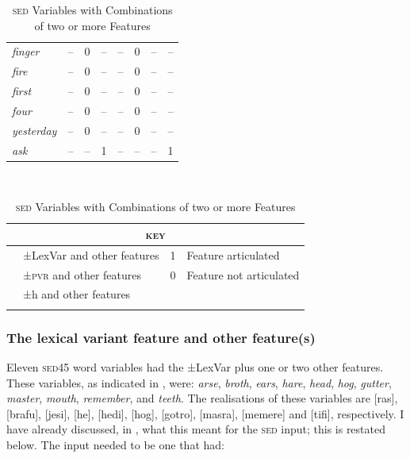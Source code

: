 {{{\begin{table}
\begin{tabularx}{.9\textwidth}{Xccccccc}
\emph{finger}\cellcolor{blue!35}  &\cellcolor{blue!35}  -- & \cellcolor{blue!35} 0 & \cellcolor{blue!35} -- &\cellcolor{blue!35}  -- & \cellcolor{blue!35} 0  & -- & --  \\   
\emph{fire} \cellcolor{blue!35}  &\cellcolor{blue!35}  -- & \cellcolor{blue!35} 0 & \cellcolor{blue!35} -- &\cellcolor{blue!35}  -- & \cellcolor{blue!35} 0  & -- & --  \\  
\emph{first} \cellcolor{blue!35}  &\cellcolor{blue!35}  -- & \cellcolor{blue!35} 0 & \cellcolor{blue!35} -- &\cellcolor{blue!35}  -- & \cellcolor{blue!35} 0  & -- & --  \\  
\emph{four} \cellcolor{blue!35}  &\cellcolor{blue!35}  -- & \cellcolor{blue!35} 0 & \cellcolor{blue!35} -- &\cellcolor{blue!35}  -- & \cellcolor{blue!35} 0  & -- & --  \\   
\emph{yesterday} \cellcolor{blue!35}  &\cellcolor{blue!35}  -- & \cellcolor{blue!35} 0 & \cellcolor{blue!35} -- &\cellcolor{blue!35}  -- & \cellcolor{blue!35} 0  & -- & --  \\    
\emph{ask} \cellcolor{orange!35} & \cellcolor{orange!35}-- & \cellcolor{orange!35}-- & \cellcolor{orange!35}1 & \cellcolor{orange!35}-- & \cellcolor{orange!35}--  & \cellcolor{orange!35}-- & \cellcolor{orange!35}1  \\  
\midrule
\end{tabularx}\\
\begin{tabularx}{.9\textwidth}{lXll}
\multicolumn{4}{c}{\scshape key}\\\midrule
\cellcolor{green!35} & {±LexVar and other features} &  {{1}} & Feature articulated  \\
\cellcolor{blue!35} & {±\textsc{pvr} and other features} &  {{0}} & Feature not articulated \\
\cellcolor{orange!35} & {±h and other features} \\
\lspbottomrule 
\end{tabularx}
\caption{\textsc{sed} Variables with Combinations of two or more Features}
\label{Table 3.8}
\end{table}

\subsubsection {The lexical variant feature and other feature(s)}
Eleven \textsc{sed45} word variables had the ±LexVar plus one or two other features. These variables, as indicated in , were: \emph{arse}, \emph{broth}, \emph{ears}, \emph{hare}, \emph{head}, \emph{hog}, \emph{gutter}, \emph{master}, \emph{mouth}, \emph{remember}, and \emph{teeth}. The  realisations of these variables are [ras], [brafu], [jesi], [he], [hedi], [hog], [gotro], [masra], [memere] and [tifi], respectively. I have already discussed, in  , what this meant for the \textsc{sed} input; this is restated below. The input needed to be one that had:

}}}
